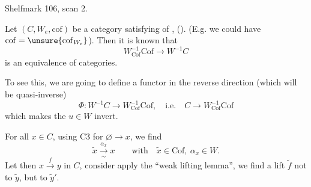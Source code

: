 Shelfmark 106, scan 2.

Let $(C,W_e,\mathrm{cof})$ be a category satisfying  of \uline{}, ().
(E.g. we could have $\mathrm{cof}=\unsure{\mathrm{cof}_{W_e}}$). Then it is known that
\[
W_{\mathrm{Cof}}^{-1}\mathrm{Cof}\longrightarrow W^{-1}C
\]
is an equivalence of categories.

To see this, we are going to define a functor in the reverse direction (which will be quasi-inverse)
\[
\Phi:W^{-1}C\longrightarrow W_{\mathrm{Cof}}^{-1}\mathrm{Cof},\quad\text{i.e.}\quad C\longrightarrow W_{\mathrm{Cof}}^{-1}\mathrm{Cof}
\]
which makes the $u\in W$ invert.

For all $x\in C$, using C3 for $\varnothing\longrightarrow x$, we find
\[
\tilde x\xrightarrow[\sim]{\alpha_x}x\qquad\text{with}\quad \tilde x\in\mathrm{Cof},\ \alpha_x\in W.
\]
Let then $x\xrightarrow{f}y$ in $C$,
consider
apply the ``weak lifting lemma'', we find
a lift $\tilde f$    not to $\tilde y$, but to $\tilde y'$.

